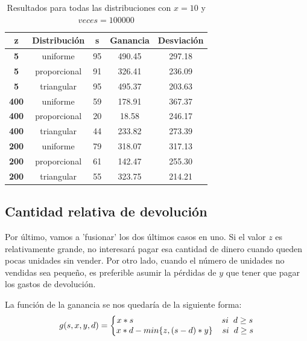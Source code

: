 \documentclass[11pt,a4paper]{report}
\begin{document}
\begin{table}[H]
	\centering
	\begin{tabular}{c|cccc}
	\textbf{\hspace{5mm}z\hspace{5mm}}   & \textbf{Distribución} & \textbf{\hspace{5mm}s\hspace{5mm}} & \textbf{Ganancia} & \textbf{Desviación} \\ \hline
	\textbf{5}   & uniforme 			 & 95         & 490.45            & 297.18 			  \\
	\textbf{5}   & proporcional			 & 91         & 326.41            & 236.09			  \\
	\textbf{5}   & triangular 			 & 95         & 495.37            & 203.63			  \\ \hline
	\textbf{400} & uniforme 			 & 59         & 178.91            & 367.37 			  \\
	\textbf{400} & proporcional			 & 20         & 18.58             & 246.17			  \\
	\textbf{400} & triangular 		     & 44         & 233.82            & 273.39			  \\ \hline
	\textbf{200} & uniforme 			 & 79         & 318.07            & 317.13 			  \\
	\textbf{200} & proporcional		     & 61         & 142.47            & 255.30			  \\
	\textbf{200} & triangular 		     & 55         & 323.75            & 214.21			  \\
	\end{tabular}
	\caption{Resultados para todas las distribuciones con $x=10$ y $veces=100000$}
\end{table}



\subsection{Cantidad relativa de devolución}

Por último, vamos a 'fusionar' los dos últimos casos en uno. Si el valor $z$ es relativamente grande, no interesará pagar esa cantidad
de dinero cuando queden pocas unidades sin vender. Por otro lado, cuando el número de unidades no vendidas sea pequeño, es preferible asumir
la pérdidas de $y$ que tener que pagar los gastos de devolución.

La función de la ganancia se nos quedaría de la siguiente forma:
\begin{equation}
	g(s,x,y,d)=\left\{\begin{matrix}
	x*s\hspace{37mm}si\hspace{2mm}d\geq s\\ 
	x*d-min\{z,(s-d)*y\}\hspace{4mm}si\hspace{2mm}d\geq s
	\end{matrix}\right.
\end{equation}
\end{document}

